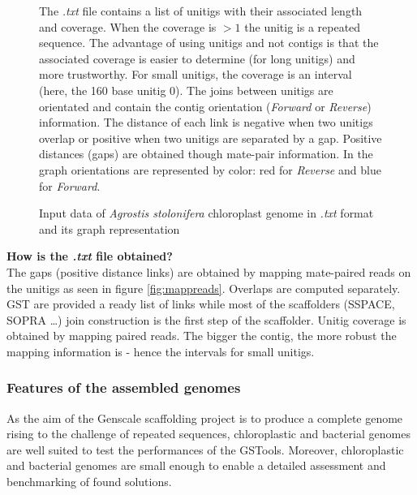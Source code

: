 \documentclass[12pt, twocolumn]{article}
\begin{document}
\begin{figure}[h!]
{
}
\caption{Input data of \textit{Agrostis stolonifera} chloroplast genome in \textit{.txt} format and its graph representation}
\label{fig:inpagrostis}
\scriptsize The \textit{.txt} file contains a list of unitigs with their associated length and coverage. When the coverage is $>1$ the unitig is a repeated sequence. The advantage of using unitigs and not contigs is that the associated coverage is easier to determine (for long unitigs) and more trustworthy. For small unitigs, the coverage is an interval (here, the 160 base unitig 0). The joins between unitigs are orientated and contain the contig orientation (\textit{Forward} or \textit{Reverse}) information. The distance of each link is negative when two unitigs overlap or positive when two unitigs are separated by a gap. Positive distances (gaps) are obtained though mate-pair information. In the graph orientations are represented by color: red for \textit{Reverse} and blue for \textit{Forward}.
\end{figure}

\vspace{-0.2cm}
\textbf{How is the \textit{.txt} file obtained? }\\
The gaps (positive distance links) are obtained by mapping mate-paired reads on the unitigs as seen in figure \ref{fig:mappreads}. Overlaps are computed separately. GST are provided a ready list of links while most of the scaffolders (SSPACE, SOPRA \ldots) join construction is the first step of the scaffolder. Unitig coverage is obtained by mapping paired reads. The bigger the contig, the more robust the mapping information is - hence the intervals for small unitigs.

\newpage

\subsubsection{Features of the assembled genomes}
\label{sec:genomefeatures}
As the aim of the Genscale scaffolding project is to produce a complete genome rising to the challenge of repeated sequences, chloroplastic and bacterial genomes are well suited to test the performances of the GSTools. Moreover, chloroplastic and bacterial genomes are small enough to enable a detailed assessment and benchmarking of found solutions.
\end{document}
